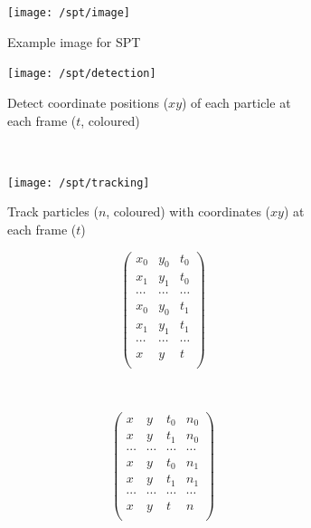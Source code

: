 \begin{figure}
    \centering
    \begin{subfigure}[t]{0.4\linewidth}
            \centering
            \texttt{[image: /spt/image]}
            \caption{Example image for \gls{SPT}}
    \end{subfigure}
    \begin{subfigure}[t]{0.45\linewidth}
            \centering
            \texttt{[image: /spt/detection]}
            \caption{
                Detect coordinate positions (\(xy\)) of each particle at each frame (\(t\), coloured)
            }
    \end{subfigure}~~
    \begin{subfigure}[t]{0.45\linewidth}
            \centering
            \texttt{[image: /spt/tracking]}
            \caption{
                Track particles (\(n\), coloured) with coordinates (\(xy\)) at each frame (\(t\))
            }
    \end{subfigure}
    \caption{Routine for detecting and tracking particles.}\label{fig:particle_track}
    \begin{subfigure}[t]{0.45\linewidth}
        \centering
        \begin{equation}
            \begin{pmatrix}
              x_0 & y_0 & t_0 \\
              x_1 & y_1 & t_0 \\
              \cdots & \cdots & \cdots \\
              x_0 & y_0 & t_1 \\
              x_1 & y_1 & t_1 \\
              \cdots & \cdots & \cdots \\
              x & y & t \\
            \end{pmatrix}
        \end{equation}
    \end{subfigure}~~
    \begin{subfigure}[t]{0.45\linewidth}
            \centering
            \begin{equation}
                \begin{pmatrix}
              x & y & t_0 & n_0\\
              x & y & t_1 & n_0 \\
              \cdots & \cdots & \cdots & \cdots \\
              x & y & t_0 & n_1 \\
              x & y & t_1 & n_1 \\
              \cdots & \cdots & \cdots & \cdots \\
              x & y & t & n \\
            \end{pmatrix}
        \end{equation}
    \end{subfigure}
\end{figure}

